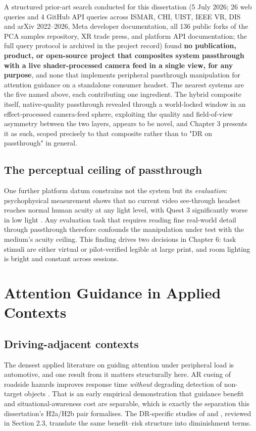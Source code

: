 A structured prior-art search conducted for this dissertation (5 July 2026; 26 web queries and 4
GitHub API queries across ISMAR, CHI, UIST, IEEE VR, DIS and arXiv 2022–2026, Meta developer
documentation, all 136 public forks of the PCA samples repository, XR trade press, and platform API
documentation; the full query protocol is archived in the project record) found \textbf{no publication,
product, or open-source project that composites system passthrough with a live shader-processed
camera feed in a single view, for any purpose}, and none that implements peripheral passthrough
manipulation for attention guidance on a standalone consumer headset. The nearest systems are the
five named above, each contributing one ingredient. The hybrid composite itself, native-quality
passthrough revealed through a world-locked window in an effect-processed camera-feed sphere,
exploiting the quality and field-of-view asymmetry between the two layers, appears to be novel, and
Chapter 3 presents it as such, scoped precisely to that composite rather than to "DR on passthrough"
in general.

\subsection{The perceptual ceiling of passthrough}

One further platform datum constrains not the system but its \textit{evaluation}: psychophysical
measurement shows that no current video see-through headset reaches normal human acuity at any
light level, with Quest 3 significantly worse in low light \citep{wang2026}. Any evaluation task that
requires reading fine real-world detail through passthrough therefore confounds the manipulation
under test with the medium's acuity ceiling. This finding drives two decisions in Chapter 6: task
stimuli are either virtual or pilot-verified legible at large print, and room lighting is bright and
constant across sessions.

\section{Attention Guidance in Applied Contexts}

\subsection{Driving-adjacent contexts}

The densest applied literature on guiding attention under peripheral load is automotive, and one
result from it matters structurally here. AR cueing of roadside hazards improves response time
\textit{without} degrading detection of non-target objects \citep[N = 27]{rusch2013}. That is an
early empirical demonstration that guidance benefit and situational-awareness cost are separable,
which is exactly the separation this dissertation's H2a/H2b pair formalises. The DR-specific studies
of \citet{murph2021} and \citet{mclaughlin2025}, reviewed in Section 2.3, translate the same
benefit–risk structure into diminishment terms.

